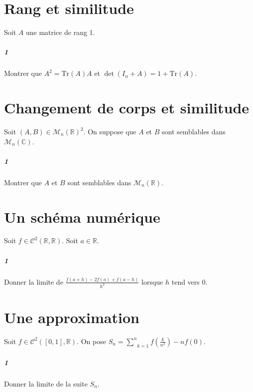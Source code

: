 \documentclass[10pt,a4paper]{article}
\begin{document}
\section{Rang et similitude}

Soit $A$ une matrice de rang 1.
\subparagraph{1}Montrer que $A^2 = \text{Tr}(A)A$ et $\det(I_n +A) = 1 + \text{Tr}(A)$.

\section{Changement de corps et similitude}
Soit $(A,B) \in \mathcal{M}_n \left( \mathbb{R} \right)^2$. On suppose que $A$ et $B$ sont semblables dans $\mathcal{M}_n\left( \mathbb{C} \right)$.
\subparagraph{1}Montrer que $A$ et $B$ sont semblables dans $\mathcal{M}_n \left( \mathbb{R} \right)$.

\section{Un schéma numérique}
Soit $f \in \mathcal{C}^2\left( \mathbb{R}, \mathbb{R} \right)$. Soit $a \in \mathbb{R}$.
\subparagraph{1}Donner la limite de $\frac{f(a+h) - 2f(a) +f(a-h)}{h^2}$ lorsque $h$ tend vers $0$.

\section{Une approximation}
Soit $f \in \mathcal{C}^2 \left( [0,1], \mathbb{R} \right)$. On pose $S_n = \underset{k=1}{\overset{n}{\sum}}f(\frac{k}{n^2}) - nf(0)$.
\subparagraph{1}Donner la limite de la suite $S_n$.
\end{document}
